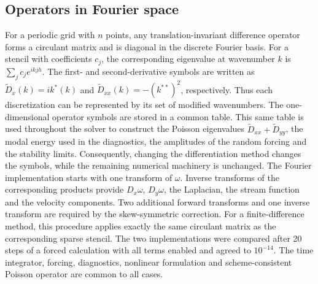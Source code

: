 \documentclass[11pt,a4paper]{article}
\begin{document}
\subsection{Operators in Fourier space}
For a periodic grid with $n$ points, any translation-invariant difference operator forms a circulant matrix and is diagonal in the discrete Fourier basis. For a stencil with coefficients $c_j$, the corresponding eigenvalue at wavenumber $k$ is
$\sum_jc_je^{ikjh}$. The first- and second-derivative symbols are written as
$\tilde D_x(k)=ik^*(k)$ and $\tilde D_{xx}(k)=-(k^{**})^2$, respectively. Thus each discretization can be represented by its set of modified wavenumbers.
The one-dimensional operator symbols are stored in a common table. This same table is used throughout the solver to construct the Poisson eigenvalues $\tilde D_{xx}+\tilde D_{yy}$, the modal energy used in the diagnostics, the amplitudes of the random forcing and the stability limits. Consequently, changing the differentiation method changes the symbols, while the remaining numerical machinery is unchanged.
The Fourier implementation starts with one transform of $\omega$. Inverse transforms of the corresponding products provide $D_x\omega$, $D_y\omega$, the Laplacian, the stream function and the velocity components. Two additional forward transforms and one inverse transform are required by the skew-symmetric correction. For a finite-difference method, this procedure applies exactly the same circulant matrix as the corresponding sparse stencil. The two implementations were compared after 20 steps of a forced calculation with all terms enabled and agreed to $10^{-14}$. The time integrator, forcing, diagnostics, nonlinear formulation and scheme-consistent Poisson operator are common to all cases.
\end{document}
